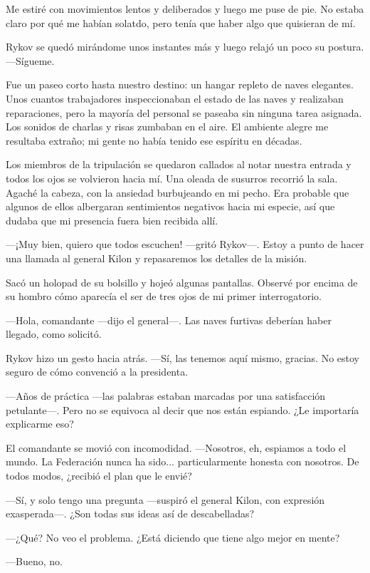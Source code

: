 Me estiré con movimientos lentos y deliberados y luego me puse de pie. No estaba claro por qué me habían solatdo, pero tenía que haber algo que quisieran de mí.

Rykov se quedó mirándome unos instantes más y luego relajó un poco su postura. —Sígueme.

Fue un paseo corto hasta nuestro destino: un hangar repleto de naves elegantes. Unos cuantos trabajadores inspeccionaban el estado de las naves y realizaban reparaciones, pero la mayoría del personal se paseaba sin ninguna tarea asignada. Los sonidos de charlas y risas zumbaban en el aire. El ambiente alegre me resultaba extraño; mi gente no había tenido ese espíritu en décadas.

Los miembros de la tripulación se quedaron callados al notar nuestra entrada y todos los ojos se volvieron hacia mí. Una oleada de susurros recorrió la sala. Agaché la cabeza, con la ansiedad burbujeando en mi pecho. Era probable que algunos de ellos albergaran sentimientos negativos hacia mi especie, así que dudaba que mi presencia fuera bien recibida allí.

—¡Muy bien, quiero que todos escuchen! —gritó Rykov—. Estoy a punto de hacer una llamada al general Kilon y repasaremos los detalles de la misión.

Sacó un holopad de su bolsillo y hojeó algunas pantallas. Observé por encima de su hombro cómo aparecía el ser de tres ojos de mi primer interrogatorio.

—Hola, comandante —dijo el general—. Las naves furtivas deberían haber llegado, como solicitó.

Rykov hizo un gesto hacia atrás. —Sí, las tenemos aquí mismo, gracias. No estoy seguro de cómo convenció a la presidenta.

—Años de práctica —las palabras estaban marcadas por una satisfacción petulante—. Pero no se equivoca al decir que nos están espiando. ¿Le importaría explicarme eso?

El comandante se movió con incomodidad. —Nosotros, eh, espiamos a todo el mundo. La Federación nunca ha sido... particularmente honesta con nosotros. De todos modos, ¿recibió el plan que le envié?

—Sí, y solo tengo una pregunta —suspiró el general Kilon, con expresión exasperada—. ¿Son todas sus ideas así de descabelladas?

 —¿Qué? No veo el problema. ¿Está diciendo que tiene algo mejor en mente?

—Bueno, no.

